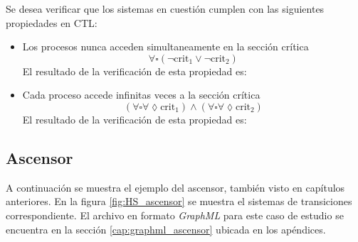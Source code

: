 
Se desea verificar que los sistemas en cuestión cumplen con las siguientes propiedades en CTL:
\begin{itemize}
\item Los procesos nunca acceden simultaneamente en la sección crítica
\[ \forall \square (\lnot \text{crit}_1 \lor \lnot \text{crit}_2) \]
El resultado de la verificación de esta propiedad es:

\fbox{\parbox{\textwidth}{\scriptsize}}

\item Cada proceso accede infinitas veces a la sección crítica
\[ (\forall \square \forall \lozenge \text{crit}_1) \land (\forall \square \forall \lozenge \text{crit}_2) \]
El resultado de la verificación de esta propiedad es:

\fbox{\parbox{\textwidth}{\scriptsize}}

\end{itemize}


\subsection{Ascensor}
A continuación se muestra el ejemplo del ascensor, también visto en
 capítulos anteriores.
En la figura \ref{fig:HS_ascensor} se muestra el sistemas de transiciones
 correspondiente.
El archivo en formato \textit{GraphML} para este caso de estudio se encuentra en la
 sección \ref{cap:graphml_ascensor} ubicada en los apéndices.

%


